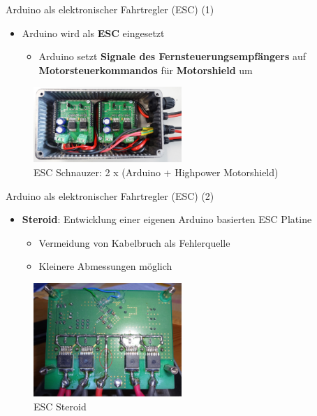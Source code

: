 \documentclass{beamer}
\begin{document}
\begin{frame}{Arduino als elektronischer Fahrtregler (ESC) (1)}
\begin{itemize}
	\item Arduino wird als \textbf{ESC} eingesetzt
	\begin{itemize}
		\item Arduino setzt \textbf{Signale des Fernsteuerungsempf\"angers} auf \textbf{Motorsteuerkommandos} f\"ur \textbf{Motorshield} um
	\end{itemize}
\end{itemize}
 \begin{figure}[H]
 	\centering
 	\includegraphics[width=0.5\textwidth]{./images/arduino-schnauzer.jpg}
 	\caption{ESC Schnauzer: 2 x (Arduino + Highpower Motorshield)}
 \end{figure}
\end{frame}
\begin{frame}{Arduino als elektronischer Fahrtregler (ESC) (2)}
\begin{itemize}
	\item \textbf{Steroid}: Entwicklung einer eigenen Arduino basierten ESC Platine
	\begin{itemize}
		\item Vermeidung von Kabelbruch als Fehlerquelle
		\item Kleinere Abmessungen m\"oglich
	\end{itemize}
\end{itemize}
\begin{figure}[H]
 	\centering
 	\includegraphics[width=0.5\textwidth]{./images/arduino-steroid.jpg}
 	\caption{ESC Steroid}
\end{figure}
\end{frame}
\end{document}
